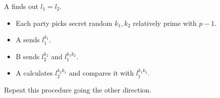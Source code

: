 \documentclass{article}
\begin{document}
A finds out $l_1=l_2$.

\begin{itemize}
    \item Each party picks secret random $k_1, k_2$ relatively prime with $p-1$.
    
    \item A sends $l_1^{k_1}$.
    
    \item B sends $l_2^{k_2}$ and $l_1^{k_1 k_2}$.
    
    \item A calculates $l_2^{k_2 k_1}$ and compares it with $l_1^{k_1 k_2}$.
    
\end{itemize}

Repeat this procedure going the other direction.
\end{document}
